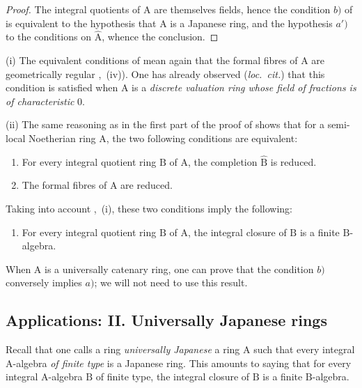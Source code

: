 \begin{proof}
The integral quotients of $\mathrm{A}$ are themselves fields, hence the condition $b)$ of  is equivalent to the hypothesis that $\mathrm{A}$ is a Japanese ring, and the hypothesis $a')$ to the conditions on $\widehat{\mathrm{A}}$, whence the conclusion.
\end{proof}

\begin{remarks}[7.6.7]
\label{IV.7.6.7}
(i) The equivalent conditions of  mean again that the formal fibres of $\mathrm{A}$ are geometrically regular ,~(iv)). One has already observed (\emph{loc.\ cit.}) that this condition is satisfied when $\mathrm{A}$ is a \emph{discrete valuation ring whose field of fractions is of characteristic} $0$.

(ii) The same reasoning as in the first part of the proof of  shows that for a semi-local Noetherian ring $\mathrm{A}$, the two following conditions are equivalent:
\begin{enumerate}[label=\emph{\alph*)}]
  \item For every integral quotient ring $\mathrm{B}$ of $\mathrm{A}$, the completion $\widehat{\mathrm{B}}$ is reduced.
  \item[\rm a$'$)] The formal fibres of $\mathrm{A}$ are reduced.
\end{enumerate}
Taking into account ,~(i), these two conditions imply the following:
\begin{enumerate}[label=\emph{\alph*)}]
  \item[b)] For every integral quotient ring $\mathrm{B}$ of $\mathrm{A}$, the integral closure of $\mathrm{B}$ is a finite $\mathrm{B}$-algebra.
\end{enumerate}
When $\mathrm{A}$ is a universally catenary ring, one can prove that the condition $b)$ conversely implies $a)$; we will not need to use this result.
\end{remarks}


\subsection{Applications: II. Universally Japanese rings}
\label{subsection:IV.7.7}

\begin{env}[7.7.1]
\label{IV.7.7.1}
Recall  that one calls a ring \emph{universally Japanese} a ring $\mathrm{A}$ such that every integral $\mathrm{A}$-algebra \emph{of finite type} is a Japanese ring. This amounts to saying that for every integral $\mathrm{A}$-algebra $\mathrm{B}$ of finite type, the integral closure of $\mathrm{B}$ is a finite $\mathrm{B}$-algebra.
\end{env}

